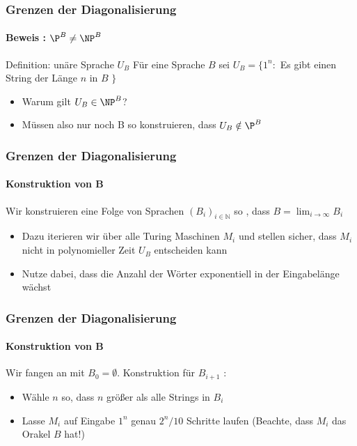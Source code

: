 \begin{frame}
	\frametitle{Grenzen der Diagonalisierung}
	\framesubtitle{Beweis : ${\P}^B \neq {\NP}^B$}
	\begin{KITinfoblock}{Definition: unäre Sprache $U_B$}
		Für eine Sprache $B$ sei $U_B = \lbrace 1^n :$ Es gibt einen String
		der L\"ange $n$ in $B$ $\rbrace $
	\end{KITinfoblock}	
	\pause
	
	\begin{itemize}[<+->]
		\item Warum gilt $U_B \in {\NP}^B$?
		\item M\"ussen also nur noch B so konstruieren, dass $U_B \notin {\P}^B$
	\end{itemize}
\end{frame}

\begin{frame}
	\frametitle{Grenzen der Diagonalisierung}
	\framesubtitle{Konstruktion von B}
	Wir konstruieren eine Folge von Sprachen $(B_i)_{i \in \mathbb{N}}$ so , dass 
	$B = \lim_{i \to \infty} B_i$	
	\begin{itemize}[<+->]
	\item Dazu iterieren wir \"uber alle Turing Maschinen $M_i$ und stellen
	sicher, dass $M_i$ nicht in polynomieller Zeit $U_B$ entscheiden kann
	\item Nutze dabei, dass die Anzahl der Wörter exponentiell in der Eingabelänge wächst
	\end{itemize}
\end{frame}
\begin{frame}
	\frametitle{Grenzen der Diagonalisierung}
	\framesubtitle{Konstruktion von B}
	Wir fangen an mit $B_0 = \emptyset$. Konstruktion f\"ur $B_{i+1}$ :
	\begin{itemize}[<+->]
		\item Wähle $n$ so, dass $n$ größer als alle Strings in $B_i$
		\item Lasse $M_i$ auf Eingabe $1^n$ genau $2^n / 10$ Schritte laufen
		\newline (Beachte, dass $M_i$ das Orakel $B$ hat!)
	\end{itemize}
\end{frame}
